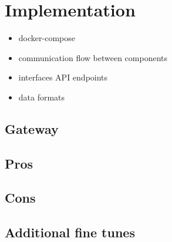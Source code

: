 \chapter{Implementation}

\begin{itemize}
	\item docker-compose
	\item communication flow between components
	\item interfaces API endpoints
	\item data formats
\end{itemize}

\section{Gateway}

\section{Pros}

\section{Cons}

\section{Additional fine tunes}